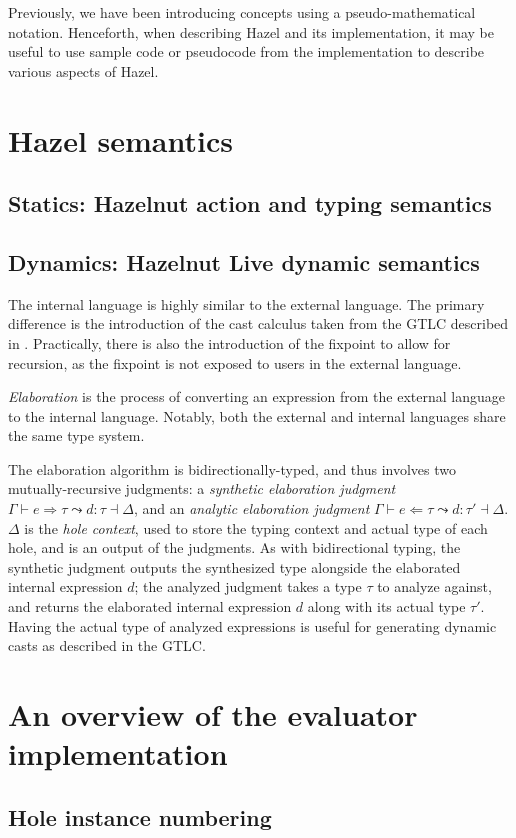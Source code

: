 Previously, we have been introducing concepts using a pseudo-mathematical notation. Henceforth, when describing Hazel and its implementation, it may be useful to use sample code or pseudocode from the implementation to describe various aspects of Hazel.


\section{Hazel semantics}
\label{sec:hazel-semantics}

\subsection{Statics: Hazelnut action and typing semantics}
\label{sec:hazel-statics}

\subsection{Dynamics: Hazelnut Live dynamic semantics}
\label{sec:hazel-dynamics}

The internal language is highly similar to the external language. The primary difference is the introduction of the cast calculus taken from the GTLC described in . Practically, there is also the introduction of the fixpoint to allow for recursion, as the fixpoint is not exposed to users in the external language.

\textit{Elaboration} is the process of converting an expression from the external language to the internal language. Notably, both the external and internal languages share the same type system.

The elaboration algorithm is bidirectionally-typed, and thus involves two mutually-recursive judgments: a \textit{synthetic elaboration judgment} $\Gamma\vdash e\Rightarrow\tau\leadsto d:\tau\dashv\Delta$, and an \textit{analytic elaboration judgment} $\Gamma\vdash e\Leftarrow\tau\leadsto d:\tau'\dashv\Delta$. $\Delta$ is the \textit{hole context}, used to store the typing context and actual type of each hole, and is an output of the judgments. As with bidirectional typing, the synthetic judgment outputs the synthesized type alongside the elaborated internal expression $d$; the analyzed judgment takes a type $\tau$ to analyze against, and returns the elaborated internal expression $d$ along with its actual type $\tau'$. Having the actual type of analyzed expressions is useful for generating dynamic casts as described in the GTLC.

\section{An overview of the evaluator implementation}
\label{sec:evaluator-overview}

\subsection{Hole instance numbering}
\label{sec:hole-instance-numbering}


